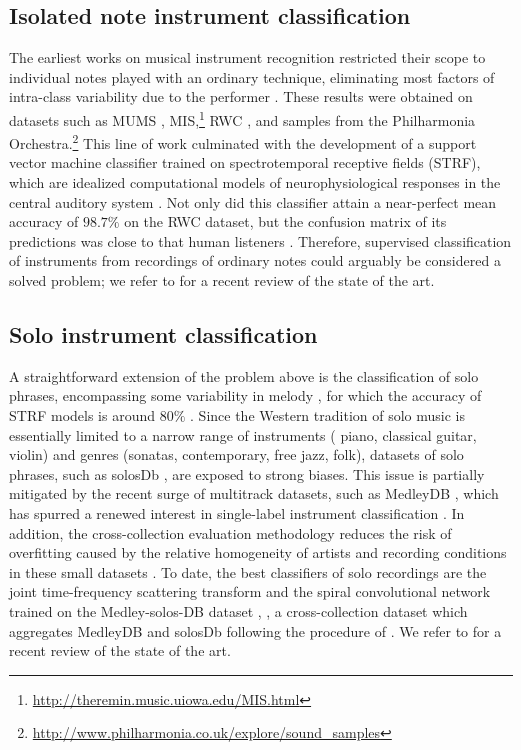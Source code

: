 \subsection{Isolated note instrument classification}
The earliest works on musical instrument recognition restricted their scope to individual notes played with an ordinary technique, eliminating most factors of intra-class variability due to the performer \cite{martin1998asa,brown1999jasa,eronen2000icassp,herrera2003jnmr,wieczorkowska2003jiis,kaminskyj2005jiis,benetos2006icassp}.
These results were obtained on datasets such as MUMS \cite{opolko1989dataset}, MIS,\footnote{\url{http://theremin.music.uiowa.edu/MIS.html}} RWC \cite{goto2003ismir}, and samples from the Philharmonia Orchestra.\footnote{\url{http://www.philharmonia.co.uk/explore/sound_samples}}
This line of work culminated with the development of a support vector machine classifier trained on spectrotemporal receptive fields (STRF), which are idealized computational models of neurophysiological responses in the central auditory system \cite{chi2005jasa}.
Not only did this classifier attain a near-perfect mean accuracy of $98.7\%$ on the RWC dataset, but the confusion matrix of its predictions was close to that human listeners \cite{patil2012plos}.
Therefore, supervised classification of instruments from recordings of ordinary notes could arguably be considered a solved problem; we refer to \cite{bhalke2016jiis} for a recent review of the state of the art.

\subsection{Solo instrument classification}
A straightforward extension of the problem above is the classification of solo phrases, encompassing some variability in melody \cite{krishna2004icassp}, for which the accuracy of STRF models is around $80\%$ \cite{patil2015eurasip}.
Since the Western tradition of solo music is essentially limited to a narrow range of instruments (\eg{} piano, classical guitar, violin) and genres (sonatas, contemporary, free jazz, folk), datasets of solo phrases, such as solosDb \cite{joder2009taslp}, are exposed to strong biases.
This issue is partially mitigated by the recent surge of multitrack datasets, such as MedleyDB \cite{bittner2014ismir}, which has spurred a renewed interest in single-label instrument classification \cite{yip2017ismir}.
In addition, the cross-collection evaluation methodology \cite{livshin2003ismir} reduces the risk of overfitting caused by the relative homogeneity of artists and recording conditions in these small datasets \cite{bogdanov2016ismir}.
To date, the best classifiers of solo recordings are the joint time-frequency scattering transform \cite{anden2018tsp} and the spiral convolutional network \cite{lostanlen2016ismir} trained on the Medley-solos-DB dataset \cite{lostanlen2018msdb}, \ie{}, a cross-collection dataset which aggregates MedleyDB and solosDb following the procedure of \cite{donnelly2015icdmw}.
We refer to \cite{han2017taslp} for a recent review of the state of the art.

